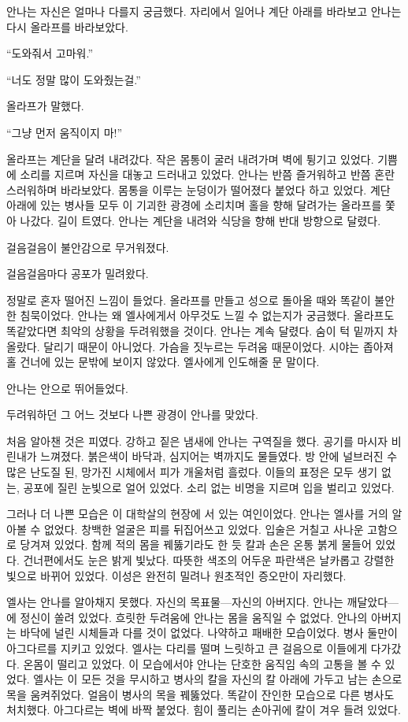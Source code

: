 안나는 자신은 얼마나 다를지 궁금했다. 자리에서 일어나 계단 아래를 바라보고 안나는 다시 올라프를 바라보았다.

``도와줘서 고마워.''

``너도 정말 많이 도와줬는걸.''

올라프가 말했다.

``그냥 먼저 움직이지 마!''

올라프는 계단을 달려 내려갔다. 작은 몸통이 굴러 내려가며 벽에 튕기고 있었다. 기쁨에 소리를 지르며 자신을 대놓고 드러내고 있었다. 안나는 반쯤 즐거워하고 반쯤 혼란스러워하며 바라보았다. 몸통을 이루는 눈덩이가 떨어졌다 붙었다 하고 있었다. 계단 아래에 있는 병사들 모두 이 기괴한 광경에 소리치며 홀을 향해 달려가는 올라프를 쫓아 나갔다. 길이 트였다. 안나는 계단을 내려와 식당을 향해 반대 방향으로 달렸다.

걸음걸음이 불안감으로 무거워졌다.

걸음걸음마다 공포가 밀려왔다.

정말로 혼자 떨어진 느낌이 들었다. 올라프를 만들고 성으로 돌아올 때와 똑같이 불안한 침묵이었다. 안나는 왜 엘사에게서 아무것도 느낄 수 없는지가 궁금했다. 올라프도 똑같았다면 최악의 상황을 두려워했을 것이다. 안나는 계속 달렸다. 숨이 턱 밑까지 차올랐다. 달리기 때문이 아니었다. 가슴을 짓누르는 두려움 때문이었다. 시야는 좁아져 홀 건너에 있는 문밖에 보이지 않았다. 엘사에게 인도해줄 문 말이다.

안나는 안으로 뛰어들었다.

두려워하던 그 어느 것보다 나쁜 광경이 안나를 맞았다.

처음 알아챈 것은 피였다. 강하고 짙은 냄새에 안나는 구역질을 했다. 공기를 마시자 비린내가 느껴졌다. 붉은색이 바닥과, 심지어는 벽까지도 물들였다. 방 안에 널브러진 수많은 난도질 된, 망가진 시체에서 피가 개울처럼 흘렀다. 이들의 표정은 모두 생기 없는, 공포에 질린 눈빛으로 얼어 있었다. 소리 없는 비명을 지르며 입을 벌리고 있었다.

그러나 더 나쁜 모습은 이 대학살의 현장에 서 있는 여인이었다. 안나는 엘사를 거의 알아볼 수 없었다. 창백한 얼굴은 피를 뒤집어쓰고 있었다. 입술은 거칠고 사나운 고함으로 당겨져 있었다. 함께 적의 몸을 꿰뚫기라도 한 듯 칼과 손은 온통 붉게 물들어 있었다. 건너편에서도 눈은 밝게 빛났다. 따뜻한 색조의 어두운 파란색은 날카롭고 강렬한 빛으로 바뀌어 있었다. 이성은 완전히 밀려나 원초적인 증오만이 자리했다.

엘사는 안나를 알아채지 못했다. 자신의 목표물—자신의 아버지다. 안나는 깨달았다—에 정신이 쏠려 있었다. 흐릿한 두려움에 안나는 몸을 움직일 수 없었다. 안나의 아버지는 바닥에 널린 시체들과 다를 것이 없었다. 나약하고 패배한 모습이었다. 병사 둘만이 아그다르를 지키고 있었다. 엘사는 다리를 떨며 느릿하고 큰 걸음으로 이들에게 다가갔다. 온몸이 떨리고 있었다. 이 모습에서야 안나는 단호한 움직임 속의 고통을 볼 수 있었다. 엘사는 이 모든 것을 무시하고 병사의 칼을 자신의 칼 아래에 가두고 남는 손으로 목을 움켜쥐었다. 얼음이 병사의 목을 꿰뚫었다. 똑같이 잔인한 모습으로 다른 병사도 처치했다. 아그다르는 벽에 바짝 붙었다. 힘이 풀리는 손아귀에 칼이 겨우 들려 있었다.

